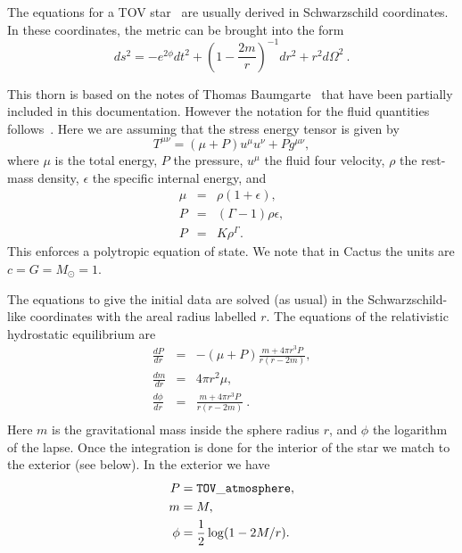 The equations for a TOV star~\cite{Tolman39,OppVol39,mtw} are usually
derived in Schwarzschild coordinates. In these coordinates, the metric can
be brought into the form
\begin{equation}
ds^2 = -e^{2\phi}dt^2 + \left(1-\dfrac{2m}{r}\right)^{-1}dr^2 + r^2 d\Omega^2 \ .
\end{equation}


This thorn is based on the notes of Thomas Baumgarte~\cite{Baumgarte-file} that 
have been partially included in this documentation. However the notation for the
fluid quantities follows~\cite{Font00a}. 
Here we are assuming that the stress energy tensor is given by
\begin{equation}
  \label{eq:Tmunu}
  T^{\mu\nu} = (\mu + P)u^{\mu}u^{\nu} + Pg^{\mu\nu},
\end{equation}
where $\mu$ is the total energy, $P$ the pressure, $u^{\mu}$ the fluid
four velocity, $\rho$ the rest-mass density, $\epsilon$ the specific
internal energy, and
\begin{eqnarray}
  \label{eq:fluidquantities}
  \mu & = & \rho (1 + \epsilon), \\
  P & = & (\Gamma - 1)\rho\epsilon, \\
  P & = & K \rho^{\Gamma}.
\end{eqnarray}
This enforces a polytropic equation of state. We note that in Cactus
the units are $c = G = M_{\odot} = 1$.

The equations to give the initial data are solved (as usual) in the
Schwarzschild-like coordinates with the areal radius labelled $r$.
The equations of the relativistic hydrostatic equilibrium are
\begin{eqnarray}
  \label{eq:TOViso}
  \frac{d P}{d r} & = & -(\mu + P) \frac{m + 4\pi r^3 P}{r(r - 2m)}, \\
%
  \frac{d m}{d r} & = & 4 \pi r^2 \mu, \\
%
  \frac{d \phi}{d r} & = & \frac{m + 4\pi r^3 P}{r(r -
    2m)} \ . \\
\end{eqnarray}
Here $m$ is the gravitational mass inside the sphere radius $r$, and
$\phi$ the logarithm of the lapse. Once the integration is done for the 
interior of the star we match to the exterior (see below). In the exterior 
we have
\begin{align}
  \label{eq:TOVexterior}
     P & =  {\tt TOV\_atmosphere}, \\
     m & =  M, \\
  \phi & = \dfrac{1}{2} \log(1-2M / r).
\end{align}

